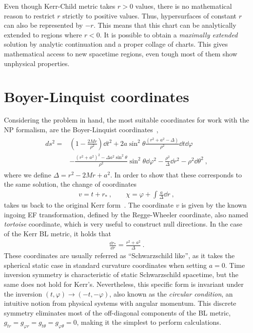 Even though Kerr-Child metric takes $r>0$ values, there is no mathematical reason to restrict $r$ strictly to positive values.
Thus, hypersurfaces of constant $r$ can also be represented by $-r$. 
This means that this chart can be analytically extended to regions where $r<0$.
It is possible to obtain a \emph{maximally extended} solution by analytic continuation and a proper collage of charts.
This gives mathematical access to new spacetime regions, even tough most of them show unphysical properties.

\section{Boyer-Linquist coordinates}

Considering the problem in hand, the most suitable coordinates for work with the NP formalism, are the Boyer-Linquist coordinates~\cite{Boyer1967},
\begin{align}
    \begin{split}
        ds^2 = & \left(1 - \frac{2 M r}{\rho^2} \right) \dd t^2 + 2 a \sin^2\theta \frac{(r^2+a^2-\Delta)}{\rho^2} \dd t \dd \varphi \\
        &- \frac{(r^2+a^2)^2- \Delta a^2 \sin^2\theta}{\rho^2} \sin^2\theta \dd\varphi^2 - \frac{\rho^2}{\Delta} \dd r^2 - \rho^2 \dd \theta^2 ~,
    \end{split}
    \label{eq2:KerrBL}
\end{align}
where we define $\Delta=r^2-2 M r + a^2$. In order to show that these corresponds to the same solution, the change of coordinates
\begin{align}
    v = t + r_* ~, \qquad \chi = \varphi + \int \frac{a}{\Delta} \dd r ~,
    \label{eq2:InEFtoBL}
\end{align}
takes us back to the original Kerr form~.
The coordinate $v$ is given by the known ingoing EF transformation, defined by the Regge-Wheeler coordinate, also named \emph{tortoise} coordinate, which is very useful to construct null directions. In the case of the Kerr BL metric, it holds that
\begin{align}
    \frac{\dd r_*}{\dd r} = \frac{r^2+a^2}{\Delta} ~.
    \label{eq2:tortoise}
\end{align}
These coordinates are usually referred as ``Schwarzschild like'', as it takes the spherical static case in standard curvature coordinates when setting $a=0$. 
Time inversion symmetry is characteristic of static Schwarzschild spacetime, but the same does not hold for Kerr's.
Nevertheless, this specific form is invariant under the inversion $(t,\varphi)\to(-t,-\varphi)$, also known as the \emph{circular condition}, an intuitive notion from physical systems with angular momentum.
This discrete symmetry eliminates most of the off-diagonal components of the BL metric, $g_{tr} = g_{\varphi r} = g_{t \theta} = g_{\varphi \theta} = 0$, making it the simplest to perform calculations.

